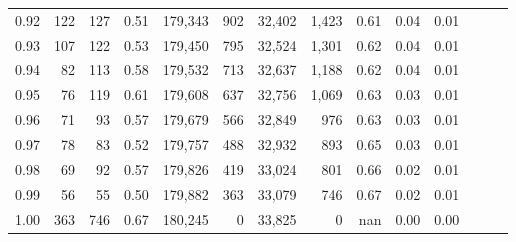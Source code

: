 \begin{tabular}{rrrrrrrrrrrrrr}
0.92 &    122 &  127 &  0.51 &  179,343 &      902 &  32,402 &   1,423 &  0.61 &  0.04 &      0.01 \\
0.93 &    107 &  122 &  0.53 &  179,450 &      795 &  32,524 &   1,301 &  0.62 &  0.04 &      0.01 \\
0.94 &     82 &  113 &  0.58 &  179,532 &      713 &  32,637 &   1,188 &  0.62 &  0.04 &      0.01 \\
0.95 &     76 &  119 &  0.61 &  179,608 &      637 &  32,756 &   1,069 &  0.63 &  0.03 &      0.01 \\
0.96 &     71 &   93 &  0.57 &  179,679 &      566 &  32,849 &     976 &  0.63 &  0.03 &      0.01 \\
0.97 &     78 &   83 &  0.52 &  179,757 &      488 &  32,932 &     893 &  0.65 &  0.03 &      0.01 \\
0.98 &     69 &   92 &  0.57 &  179,826 &      419 &  33,024 &     801 &  0.66 &  0.02 &      0.01 \\
0.99 &     56 &   55 &  0.50 &  179,882 &      363 &  33,079 &     746 &  0.67 &  0.02 &      0.01 \\
1.00 &    363 &  746 &  0.67 &  180,245 &        0 &  33,825 &       0 &   nan &  0.00 &      0.00 \\
\bottomrule
\end{tabular}
